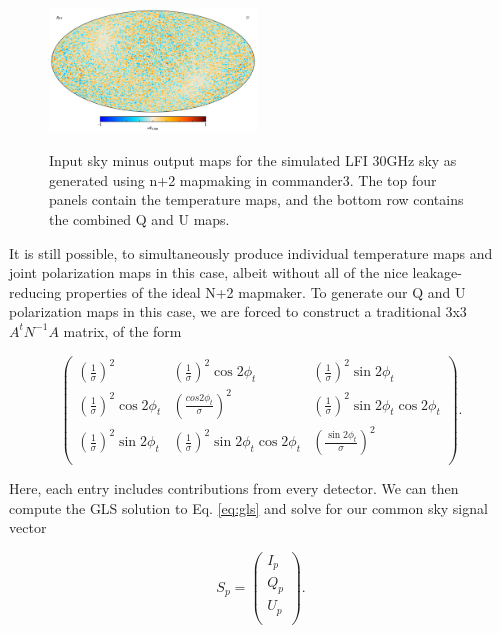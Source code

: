 \documentclass{aa}
\begin{document}
\begin{figure}
  \includegraphics[width=0.49\textwidth]{figs/sim_diff_U.pdf}\\
  \caption{Input sky minus output maps for the simulated LFI 30GHz sky as generated using n+2 mapmaking in commander3. The top four panels contain the temperature maps, and the bottom row contains the combined Q and U maps.}
  \label{fig:sim_diff}
\end{figure}

It is still possible, to simultaneously produce individual temperature maps and joint polarization maps in this case, albeit without all of the nice leakage-reducing properties of the ideal N+2 mapmaker. To generate our Q and U polarization maps in this case, we are forced to construct a traditional 3x3 $A^t N^{-1}A$ matrix, of the form

\begin{equation}
\begin{pmatrix}
(\frac{1}{\sigma})^2 &
(\frac{1}{\sigma})^2\cos2\phi_t & (\frac{1}{\sigma})^2\sin2\phi_t \\

(\frac{1}{\sigma})^2\cos2\phi_t & 
(\frac{cos 2\phi_t}{\sigma})^2 & (\frac{1}{\sigma})^2\sin2\phi_t\cos2\phi_t \\

(\frac{1}{\sigma})^2\sin2\phi_t & 
(\frac{1}{\sigma})^2\sin2\phi_t\cos2\phi_t &(\frac{\sin2\phi_t}{\sigma})^2
\\
\end{pmatrix}
.
\end{equation}

Here, each entry includes contributions from every detector. We can then compute the GLS solution to Eq. \ref{eq:gls} and solve for our common sky signal vector 

\begin{equation}
S_p = \begin{pmatrix}
I_p\\
Q_p\\
U_p\\
\end{pmatrix}.
\end{equation}
\end{document}
